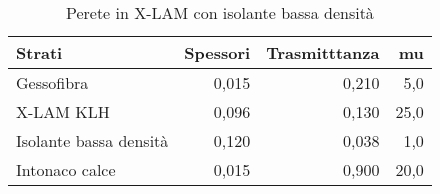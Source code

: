 \begin{table}
\centering
\caption{Perete in X-LAM con isolante bassa densità}
\begin{tabular}{lrrr}
\toprule
                 Strati & Spessori & Trasmitttanza &    mu \\
\midrule
             Gessofibra &    0,015 &         0,210 &   5,0 \\
              X-LAM KLH &    0,096 &         0,130 &  25,0 \\
 Isolante bassa densità &    0,120 &         0,038 &   1,0 \\
         Intonaco calce &    0,015 &         0,900 &  20,0 \\
\bottomrule
\end{tabular}
\end{table}
